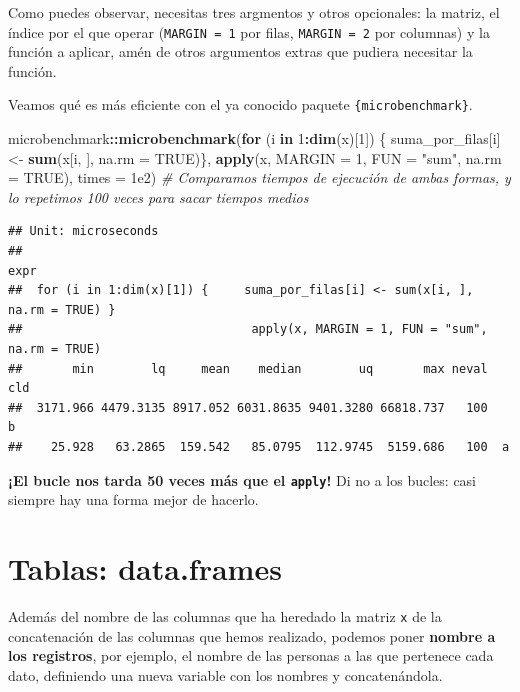 \documentclass[11pt,]{book}
\newenvironment{Shaded}{\begin{snugshade}}{\end{snugshade}}
\newcommand{\CommentTok}[1]{\textcolor[rgb]{0.37,0.37,0.37}{\textit{#1}}}
\newcommand{\ControlFlowTok}[1]{\textcolor[rgb]{0.27,0.27,0.27}{\textbf{#1}}}
\newcommand{\DataTypeTok}[1]{\textcolor[rgb]{0.27,0.27,0.27}{#1}}
\newcommand{\DecValTok}[1]{\textcolor[rgb]{0.06,0.06,0.06}{#1}}
\newcommand{\FloatTok}[1]{\textcolor[rgb]{0.06,0.06,0.06}{#1}}
\newcommand{\KeywordTok}[1]{\textcolor[rgb]{0.27,0.27,0.27}{\textbf{#1}}}
\newcommand{\NormalTok}[1]{#1}
\newcommand{\OperatorTok}[1]{\textcolor[rgb]{0.43,0.43,0.43}{\textbf{#1}}}
\newcommand{\OtherTok}[1]{\textcolor[rgb]{0.37,0.37,0.37}{#1}}
\newcommand{\StringTok}[1]{\textcolor[rgb]{0.5,0.5,0.5}{#1}}
\begin{document}
Como puedes observar, necesitas tres argmentos y otros opcionales: la matriz, el índice por el que operar (\texttt{MARGIN\ =\ 1} por filas, \texttt{MARGIN\ =\ 2} por columnas) y la función a aplicar, amén de otros argumentos extras que pudiera necesitar la función.

Veamos qué es más eficiente con el ya conocido paquete \texttt{\{microbenchmark\}}.

\begin{Shaded}
\begin{Highlighting}[]
\NormalTok{microbenchmark}\OperatorTok{::}\KeywordTok{microbenchmark}\NormalTok{(}\ControlFlowTok{for}\NormalTok{ (i }\ControlFlowTok{in} \DecValTok{1}\OperatorTok{:}\KeywordTok{dim}\NormalTok{(x)[}\DecValTok{1}\NormalTok{]) \{}
\NormalTok{  suma_por_filas[i] <-}\StringTok{ }\KeywordTok{sum}\NormalTok{(x[i, ], }\DataTypeTok{na.rm =} \OtherTok{TRUE}\NormalTok{)\}, }\KeywordTok{apply}\NormalTok{(x, }\DataTypeTok{MARGIN =} \DecValTok{1}\NormalTok{, }\DataTypeTok{FUN =} \StringTok{"sum"}\NormalTok{, }\DataTypeTok{na.rm =} \OtherTok{TRUE}\NormalTok{), }\DataTypeTok{times =} \FloatTok{1e2}\NormalTok{) }\CommentTok{# Comparamos tiempos de ejecución de ambas formas, y lo repetimos 100 veces para sacar tiempos medios}
\end{Highlighting}
\end{Shaded}

\begin{verbatim}
## Unit: microseconds
##                                                                           expr
##  for (i in 1:dim(x)[1]) {     suma_por_filas[i] <- sum(x[i, ], na.rm = TRUE) }
##                                apply(x, MARGIN = 1, FUN = "sum", na.rm = TRUE)
##       min        lq     mean    median        uq       max neval cld
##  3171.966 4479.3135 8917.052 6031.8635 9401.3280 66818.737   100   b
##    25.928   63.2865  159.542   85.0795  112.9745  5159.686   100  a
\end{verbatim}

\textbf{¡El bucle nos tarda 50 veces más que el \texttt{apply}!} Di no a los bucles: casi siempre hay una forma mejor de hacerlo.

\hypertarget{tablas-data.frames}{%
\section{Tablas: data.frames}\label{tablas-data.frames}}

Además del nombre de las columnas que ha heredado la matriz \texttt{x} de la concatenación de las columnas que hemos realizado, podemos poner \textbf{nombre a los registros}, por ejemplo, el nombre de las personas a las que pertenece cada dato, definiendo una nueva variable con los nombres y concatenándola.
\end{document}
